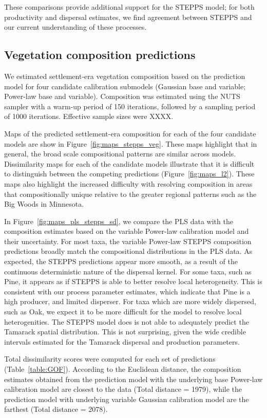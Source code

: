 \documentclass[12pt]{article}
\begin{document}
These comparisons provide additional support for the STEPPS model; for
both productivity and dispersal estimates, we find agreement between
STEPPS and our current understanding of these processes.

\subsection{Vegetation composition predictions}

We estimated settlement-era vegetation composition based on the
prediction model for four candidate calibration submodels (Gaussian
base and variable; Power-law base and variable). Composition was
estimated using the NUTS sampler with a warm-up period of 150
iterations, followed by a sampling period of 1000
iterations. Effective sample sizes were XXXX.

Maps of the predicted settlement-era composition for each of the four
candidate models are show in Figure~\ref{fig:maps_stepps_veg}. These
maps highlight that in general, the broad scale compositional patterns
are similar across models. Dissimilarity maps for each of the
candidate models illustrate that it is difficult to distinguish
between the competing predictions (Figure~\ref{fig:maps_l2}). These
maps also highlight the increased difficulty with resolving
composition in areas that compositionally unique relative to the
greater regional patterns such as the Big Woods in Minnesota.

In Figure~\ref{fig:maps_pls_stepps_sd}, we compare the PLS data with
the composition estimates based on the variable Power-law calibration
model and their uncertainty. For most taxa, the variable Power-law
STEPPS composition predictions broadly match the compositional
distributions in the PLS data. As expected, the STEPPS predictions
appear more smooth, as a result of the continuous deterministic nature
of the dispersal kernel. For some taxa, such as Pine, it appears as if
STEPPS is able to better resolve local heterogeneity. This is
consistent with our process parameter estimates, which indicate that
Pine is a high producer, and limited disperser. For taxa which are
more widely dispersed, such as Oak, we expect it to be more difficult
for the model to resolve local heterogenities. The STEPPS model does
is not able to adequately predict the Tamarack spatial
distribution. This is not surprising, given the wide credible
intervals estimated for the Tamarack dispersal and production
parameters. 

Total dissimilarity scores were computed for each set of predictions
(Table~\ref{table:GOF}). According to the Euclidean distance, the
composition estimates obtained from the prediction model with the
underlying base Power-law calibration model are closest to the data
(Total distance = 1979), while the prediction model with underlying
variable Gaussian calibration model are the farthest (Total distance =
2078).
\end{document}
